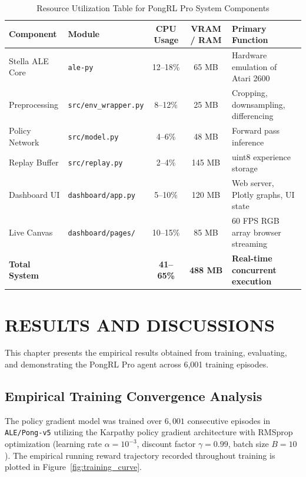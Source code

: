 \documentclass[12pt,a4paper]{report}
\begin{document}
\begin{table}[htbp]
\centering
\caption{Resource Utilization Table for PongRL Pro System Components}
\label{tab:component_costs}
\begin{tabular}{@{}llccp{5.0cm}@{}}
\toprule
\textbf{Component} & \textbf{Module} & \textbf{CPU Usage} & \textbf{VRAM / RAM} & \textbf{Primary Function} \\ \midrule
Stella ALE Core & \texttt{ale-py} & 12--18\% & 65 MB & Hardware emulation of Atari 2600 \\
Preprocessing & \texttt{src/env\_wrapper.py} & 8--12\% & 25 MB & Cropping, downsampling, differencing \\
Policy Network & \texttt{src/model.py} & 4--6\% & 48 MB & Forward pass inference \\
Replay Buffer & \texttt{src/replay.py} & 2--4\% & 145 MB & uint8 experience storage \\
Dashboard UI & \texttt{dashboard/app.py} & 5--10\% & 120 MB & Web server, Plotly graphs, UI state \\
Live Canvas & \texttt{dashboard/pages/} & 10--15\% & 85 MB & 60 FPS RGB array browser streaming \\ \midrule
\textbf{Total System} & & \textbf{41--65\%} & \textbf{488 MB} & \textbf{Real-time concurrent execution} \\ \bottomrule
\end{tabular}
\end{table}

\newpage
\chapter{RESULTS AND DISCUSSIONS}

This chapter presents the empirical results obtained from training, evaluating, and demonstrating the PongRL Pro agent across 6,001 training episodes.

\section{Empirical Training Convergence Analysis}
The policy gradient model was trained over $6,001$ consecutive episodes in \texttt{ALE/Pong-v5} utilizing the Karpathy policy gradient architecture with RMSprop optimization (learning rate $\alpha = 10^{-3}$, discount factor $\gamma = 0.99$, batch size $B=10$). The empirical running reward trajectory recorded throughout training is plotted in Figure~\ref{fig:training_curve}.
\end{document}
